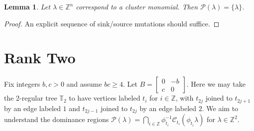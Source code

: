 \documentclass{amsart}
\newtheorem{lemma}[theorem]{Lemma}
\numberwithin{theorem}{section}
\newcommand{\cC}{\mathcal{C}}
\newcommand{\cP}{\mathcal{P}}
\newcommand{\TT}{\mathbb{T}}
\newcommand{\ZZ}{\mathbb{Z}}
\begin{document}
  \begin{lemma}
    Let $\lambda\in\ZZ^n$ correspond to a cluster monomial.
    Then $\cP(\lambda)=\{\lambda\}$.
  \end{lemma}
  \begin{proof}
    An explicit sequence of sink/source mutations should suffice.
  \end{proof}

  

  \section{Rank Two}
  Fix integers $b,c>0$ and assume $bc\ge 4$.
  Let $B=\left[ \begin{array}{cc} 0 & -b \\ c & 0 \end{array} \right]$.
  Here we may take the 2-regular tree $\TT_2$ to have vertices labeled $t_i$ for $i\in\ZZ$, with $t_{2j}$ joined to $t_{2j+1}$ by an edge labeled $1$ and $t_{2j-1}$ joined to $t_{2j}$ by an edge labeled $2$.
  We aim to understand the dominance regions $\cP(\lambda) = \bigcap_{i\in\ZZ} \phi_{t_i}^{-1} \cC_{t_i}(\phi_{t_i} \lambda)$ for $\lambda\in\ZZ^2$.
\end{document}
